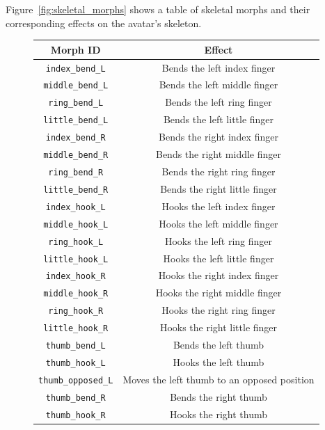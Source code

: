\documentclass[../../main.tex]{subfiles}
\begin{document}
Figure~\ref{fig:skeletal_morphs} shows a table of skeletal morphs and their corresponding effects on the avatar's skeleton.

\begin{figure}
    \centering
    \begin{tabular}{|c|c|}
        \hline
        \textbf{Morph ID} & \textbf{Effect} \\
        \hline
        \texttt{index\_bend\_L} & Bends the left index finger \\
        \texttt{middle\_bend\_L} & Bends the left middle finger \\
        \texttt{ring\_bend\_L} & Bends the left ring finger \\
        \texttt{little\_bend\_L} & Bends the left little finger \\
        \texttt{index\_bend\_R} & Bends the right index finger \\
        \texttt{middle\_bend\_R} & Bends the right middle finger \\
        \texttt{ring\_bend\_R} & Bends the right ring finger \\
        \texttt{little\_bend\_R} & Bends the right little finger \\
        \texttt{index\_hook\_L} & Hooks the left index finger \\
        \texttt{middle\_hook\_L} & Hooks the left middle finger \\
        \texttt{ring\_hook\_L} & Hooks the left ring finger \\
        \texttt{little\_hook\_L} & Hooks the left little finger \\
        \texttt{index\_hook\_R} & Hooks the right index finger \\
        \texttt{middle\_hook\_R} & Hooks the right middle finger \\
        \texttt{ring\_hook\_R} & Hooks the right ring finger \\
        \texttt{little\_hook\_R} & Hooks the right little finger \\
        \texttt{thumb\_bend\_L} & Bends the left thumb \\
        \texttt{thumb\_hook\_L} & Hooks the left thumb \\
        \texttt{thumb\_opposed\_L} & Moves the left thumb to an opposed position \\
        \texttt{thumb\_bend\_R} & Bends the right thumb \\
        \texttt{thumb\_hook\_R} & Hooks the right thumb \\

\end{tabular}
\end{figure}
\end{document}
